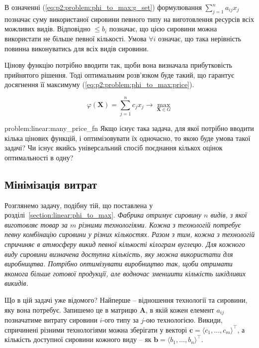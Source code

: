 \documentclass[\main/book.tex]{subfiles}
\begin{document}
В означенні (\ref{eq:p2:problem:phi_to_max:g_set}) фор\-му\-лю\-ва\-ння ${\sum_{j=1}^n a_{ij} x_j}$ позначає суму використаної сировини певного типу на виготовлення ресурсів всіх можливих видів. Відповідно \flqq{}$\leq b_i$\frqq{} позначає, що цією сировини можна використати не більше певної кількості. Умова $\forall i$ означає, що така нерівність повинна виконуватись для всіх видів сировини.

Цінову функцію потрібно вводити так, щоби вона визначала прибутковість прийнятого рішення. Тоді оптимальним розв'язком буде такий, що гарантує досягнення її максимуму (\ref{eq:p2:problem:phi_to_max:price}).

\begin{equation}
 \varphi(\mathbf{X}) =
 \sum_{j=1}^n c_j x_j \rightarrow
 \max_{\mathbf{X} \in G}
 \label{eq:p2:problem:phi_to_max:price}
\end{equation}

\begin{problem}{problem:linear:many_price_fn}
 Якщо існує така задача, для якої потрібно вводити кілька цінових функцій, і оптимізовувати їх одночасно, то якою буде умова такої задачі? Чи існує якийсь універсальний спосіб поєднання кількох оцінок оптимальності в одну?
\end{problem}

\subsection{Мінімізація витрат}

Розглянемо задачу, подібну тій, що поставлена у розділі~\ref{section:linear:phi_to_max}. \textit{Фабрика отримує сировину $n$ видів, з якої виготовляє товар за $m$ різними тех\-но\-ло\-гі\-я\-ми. Кожна з технологій потребує певну комбінацію сировини у різних кількостях. Разом з тим, кожна з технологій спричиняє в атмосферу викид певної кількості кілограм вуглецю. Для кожного виду сировини визначена доступна кількість, яку можна використати для виробництва. Потрібно оптимізувати виробництво так, щоби отримати якомога більше готової продукції, але водночас зменшити кількість шкідливих викидів.}

Що в цій задачі уже відомого? Найперше -- відношення технології та сировини, яку вона потребує. Запишемо це в матрицю $\mathbf{A}$, в якій кожен елемент $a_{ij}$ позначатиме витрату сировини $i$-ого типу за $j$-ою технологією. Викиди, спричинені різними технологіями можна зберігати у векторі $\mathbf{c} = \langle c_1, \ldots, c_m \rangle^\top$, а кількість доступної сировини кожного виду -- як $\mathbf{b} = \langle b_1, \ldots, b_n \rangle^\top$.
\end{document}
